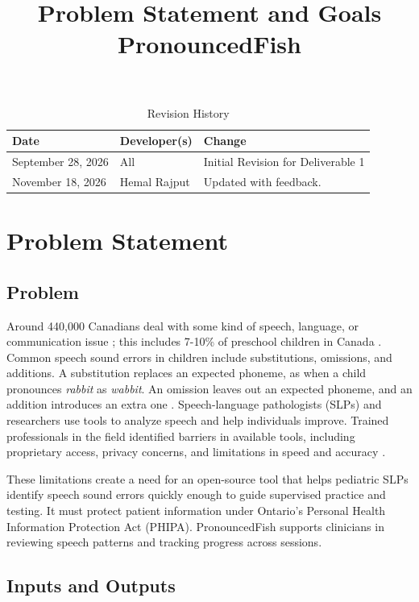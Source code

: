 \documentclass{article}
\title{Problem Statement and Goals\\PronouncedFish}
\author{\authname}
\date{}
\begin{document}
\maketitle

\begin{table}[hp]
\caption{Revision History} \label{TblRevisionHistory}
\begin{tabularx}{\textwidth}{llX}
\toprule
\textbf{Date} & \textbf{Developer(s)} & \textbf{Change}\\
\midrule
September 28, 2026 & All & Initial Revision for Deliverable 1\\
November 18, 2026 & Hemal Rajput & Updated with feedback.\\
\bottomrule
\end{tabularx}
\end{table}

\section{Problem Statement}

\subsection{Problem}

Around 440,000 Canadians deal with some kind of speech, language, or communication issue \cite{cdac2026statistics}; this includes 7-10\% of preschool children in Canada \cite{gaines2006earlyid}.
Common speech sound errors in children include substitutions, omissions, and
additions. A substitution replaces an expected phoneme, as when a child
pronounces \textit{rabbit} as \textit{wabbit}. An omission leaves out an
expected phoneme, and an addition introduces an extra one \cite{asha2025ssd}.
Speech-language pathologists (SLPs) and researchers use tools to analyze speech and
help individuals improve. Trained professionals in the field identified barriers
in available tools, including proprietary access, privacy concerns, and
limitations in speed and accuracy \cite{supervisor2026initialcomm}.

These limitations create a need for an open-source tool that helps pediatric
SLPs identify speech sound errors quickly enough to guide supervised practice
and testing. It must protect patient information under Ontario's Personal
Health Information Protection Act (PHIPA). PronouncedFish supports clinicians
in reviewing speech patterns and tracking progress across sessions.

\subsection{Inputs and Outputs}
\end{document}
